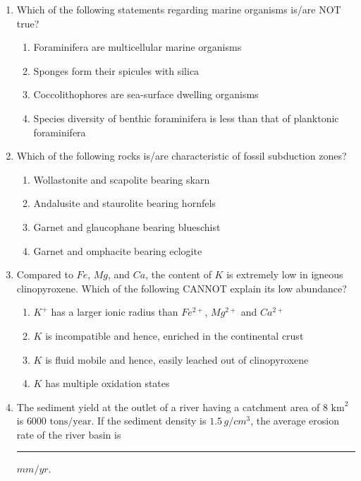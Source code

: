 \documentclass[journal,12pt,onecolumn]{IEEEtran}
\theoremstyle{remark}
\begin{document}
\begin{enumerate}
\item Which of the following statements regarding marine organisms is/are NOT true? \hfill{}
\begin{enumerate}
    \item Foraminifera are multicellular marine organisms
    \item Sponges form their spicules with silica
    \item Coccolithophores are sea-surface dwelling organisms
    \item Species diversity of benthic foraminifera is less than that of planktonic foraminifera
\end{enumerate}

\item Which of the following rocks is/are characteristic of fossil subduction zones? \hfill{}
\begin{enumerate}
    \item Wollastonite and scapolite bearing skarn
    \item Andalusite and staurolite bearing hornfels
    \item Garnet and glaucophane bearing blueschist
    \item Garnet and omphacite bearing eclogite
\end{enumerate}

\item Compared to $Fe$, $Mg$, and $Ca$, the content of $K$ is extremely low in igneous clinopyroxene. Which of the following CANNOT explain its low abundance? \hfill{}
\begin{enumerate}
    \item $K^{+}$ has a larger ionic radius than $Fe^{2+}$, $Mg^{2+}$ and $Ca^{2+}$
    \item $K$ is incompatible and hence, enriched in the continental crust
    \item $K$ is fluid mobile and hence, easily leached out of clinopyroxene
    \item $K$ has multiple oxidation states
\end{enumerate}

\item The sediment yield at the outlet of a river having a catchment area of $8 \text{ km}^2$ is $6000 \text{ tons/year}$. If the sediment density is $1.5\, g/cm^3$, the average erosion rate of the river basin is \rule{3cm}{0.15mm} $mm/yr$.  \hfill{}


\end{enumerate}
\end{document}
